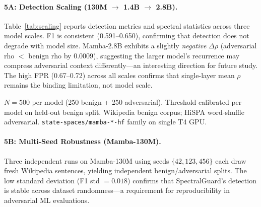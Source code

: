 \documentclass[10pt,twocolumn]{article}
\begin{document}
\paragraph{5A: Detection Scaling (130M $\to$ 1.4B $\to$ 2.8B).} %
Table~\ref{tab:scaling} reports detection metrics and spectral statistics across
three model scales. F1 is consistent (0.591--0.650), confirming that detection
does not degrade with model size. Mamba-2.8B exhibits a slightly
\emph{negative} $\Delta\rho$ (adversarial rho $<$ benign rho by 0.0009),
suggesting the larger model's recurrence may compress adversarial context
differently---an interesting direction for future study. The high FPR
(0.67--0.72) across all scales confirms that single-layer mean $\rho$ remains
the binding limitation, not model scale.

\begin{table}[t]
\centering
\caption{SpectralGuard: Detection Across Model Scales (Experiment 5A)} %
\label{tab:scaling}
\small
{}
\vspace{2pt}
\begin{minipage}{\columnwidth}
{\footnotesize $N{=}500$ per model (250 benign + 250 adversarial).
Threshold calibrated per model on held-out benign split.
Wikipedia benign corpus; HiSPA word-shuffle adversarial.
\texttt{state-spaces/mamba-*-hf} family on single T4 GPU.}
\end{minipage}
\end{table}

\paragraph{5B: Multi-Seed Robustness (Mamba-130M).} %
Three independent runs on Mamba-130M using seeds $\{42, 123, 456\}$ each draw
fresh Wikipedia sentences, yielding independent benign/adversarial splits. The low standard deviation (F1 std $= 0.018$) confirms that SpectralGuard's detection is stable across dataset randomness---a requirement
for reproducibility in adversarial ML evaluations.
\end{document}
